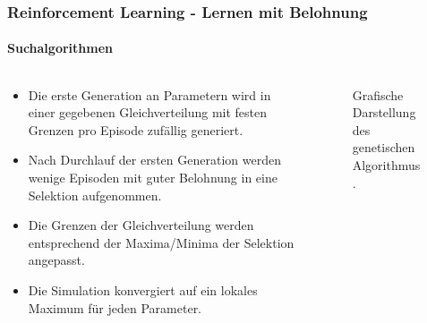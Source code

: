 \documentclass[10pt,t,aspectratio=1610]{beamer}
\newcommand{\ChapterRl}{Reinforcement Learning - Lernen mit Belohnung}
\begin{document}
\begin{frame}
\frametitle{\ChapterRl}
\framesubtitle{Suchalgorithmen}
\vspace{0.3cm}
\begin{columns}[T,onlytextwidth]
	\begin{column}{0.5\textwidth}
		\vspace{0.1cm}
		\begin{itemize}
			\item Die erste Generation an Parametern wird in einer gegebenen Gleichverteilung mit festen Grenzen pro Episode zufällig generiert.
			\item Nach Durchlauf der ersten Generation werden wenige Episoden mit guter Belohnung in eine Selektion aufgenommen.
			\item Die Grenzen der Gleichverteilung werden entsprechend der Maxima/Minima der Selektion angepasst.
			\item Die Simulation konvergiert auf ein lokales Maximum für jeden Parameter.
		\end{itemize}
	\end{column}
	\begin{column}{0.45\textwidth}
		\begin{figure}[H] %
			\centering
			\scriptsize
			\def\svgwidth{6.3cm}
			
			\caption{Grafische Darstellung des genetischen Algorithmus.}
			\label{fig:gen_alg}
		\end{figure}
	\end{column}
\end{columns}
\end{frame}

\end{document}
